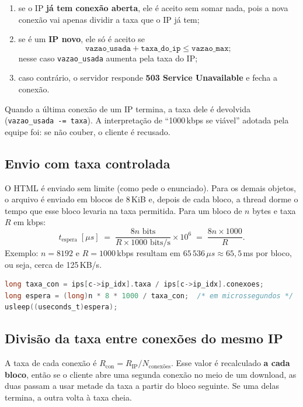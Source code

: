 \documentclass[11pt,a4paper]{article}
\begin{document}
\begin{enumerate}
  \item se o IP \textbf{já tem conexão aberta}, ele é aceito sem somar nada, pois a nova
  conexão vai apenas dividir a taxa que o IP já tem;
  \item se é um \textbf{IP novo}, ele só é aceito se
  \[ \texttt{vazao\_usada} + \texttt{taxa\_do\_ip} \le \texttt{vazao\_max}; \]
  nesse caso \texttt{vazao\_usada} aumenta pela taxa do IP;
  \item caso contrário, o servidor responde \textbf{503 Service Unavailable} e fecha a conexão.
\end{enumerate}

Quando a última conexão de um IP termina, a taxa dele é devolvida
(\texttt{vazao\_usada -= taxa}). A interpretação de ``1000\,kbps se viável'' adotada pela
equipe foi: se não couber, o cliente é recusado.

\subsection{Envio com taxa controlada}
O HTML é enviado sem limite (como pede o enunciado). Para os demais objetos, o arquivo é
enviado em blocos de 8\,KiB e, depois de cada bloco, a thread dorme o tempo que esse bloco
levaria na taxa permitida. Para um bloco de $n$ bytes e taxa $R$ em kbps:
\[
t_{\text{espera}}\;[\mu s] \;=\; \frac{8n \text{ bits}}{R \times 1000 \text{ bits/s}} \times 10^{6}
\;=\; \frac{8n \times 1000}{R}.
\]
Exemplo: $n = 8192$ e $R = 1000$\,kbps resultam em $65\,536\,\mu s \approx 65{,}5$\,ms por
bloco, ou seja, cerca de 125\,KB/s.

\begin{lstlisting}[language=C]
long taxa_con = ips[c->ip_idx].taxa / ips[c->ip_idx].conexoes;
long espera = (long)n * 8 * 1000 / taxa_con;  /* em microssegundos */
usleep((useconds_t)espera);
\end{lstlisting}

\subsection{Divisão da taxa entre conexões do mesmo IP}
A taxa de cada conexão é $R_{\text{con}} = R_{\text{IP}} / N_{\text{conexões}}$. Esse valor
é recalculado \textbf{a cada bloco}, então se o cliente abre uma segunda conexão no meio de
um download, as duas passam a usar metade da taxa a partir do bloco seguinte. Se uma delas
termina, a outra volta à taxa cheia.
\end{document}
